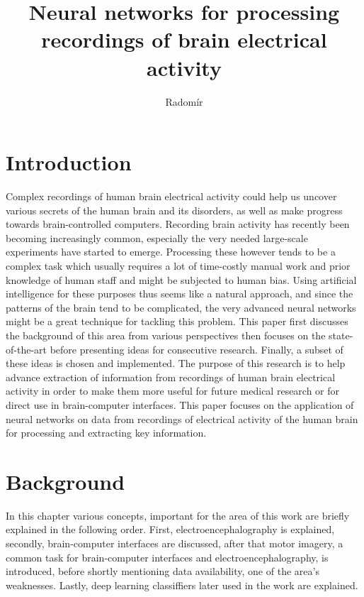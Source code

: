 \documentclass[english, he, bc, kiv, iso690alph]{fasthesis}
\author{Radomír}{Kesl}{}{}
\title{Neural networks for processing recordings of brain electrical activity}
\begin{document}
\frontpages[tm]
\tableofcontents


\chapter{Introduction}

Complex recordings of human brain electrical activity could help us uncover various secrets of the human brain and its disorders, as well as make progress towards brain-controlled computers.
Recording brain activity has recently been becoming increasingly common, especially the very needed large-scale experiments have started to emerge. Processing these however tends to be a complex task which usually requires a lot of time-costly manual work and prior knowledge of human staff and might be subjected to human bias. Using artificial intelligence for these purposes thus seems like a natural approach, and since the patterns of the brain tend to be complicated, the very advanced neural networks might be a great technique for tackling this problem.
This paper first discusses the background of this area from various perspectives then focuses on the state-of-the-art before presenting ideas for consecutive research. Finally, a subset of these ideas is chosen and implemented.
The purpose of this research is to help advance extraction of information from recordings of human brain electrical activity in order to make them more useful  for future medical research or for direct use in brain-computer interfaces.
This paper focuses on the application of neural networks on data from recordings of electrical activity of the human brain for processing and extracting key information.


\chapter{Background}

In this chapter various concepts, important for the area of this work are briefly explained in the following order. First, electroencephalography is explained, secondly, brain-computer interfaces are discussed, after that motor imagery, a common task for brain-computer interfaces and electroencephalography, is introduced, before shortly mentioning data availability, one of the area's weaknesses. Lastly, deep learning classiffiers later used in the work are explained.
\end{document}
